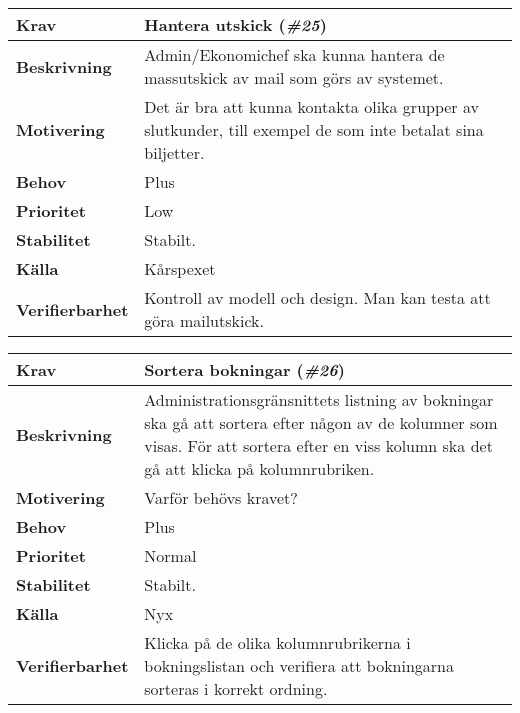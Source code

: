 \documentclass[a4paper, twoside, 11pt, titlepage]{article}
\begin{document}
	\begin{tabular} { p{2.6cm} p{12.5cm} }
		\hline
		\sffamily\textbf{Krav} & Hantera utskick (\emph{\#25})  \\
		\hline
		\sffamily\textbf{Beskrivning} & Admin/Ekonomichef ska kunna hantera de massutskick av mail som görs av systemet.  \\
		\hline
		\sffamily\textbf{Motivering} & Det är bra att kunna kontakta olika grupper av slutkunder, till exempel de som inte betalat sina biljetter.  \\
		\hline
		\sffamily\textbf{Behov} & Plus  \\
		\hline
		\sffamily\textbf{Prioritet} & Low  \\
		\hline
		\sffamily\textbf{Stabilitet} & Stabilt.  \\
		\hline
		\sffamily\textbf{Källa} & Kårspexet  \\
		\hline
		\sffamily\textbf{Verifierbarhet} & Kontroll av modell och design. Man kan testa att göra mailutskick.  \\
		\hline
	\end{tabular}
	\vspace{6mm}

	\begin{tabular} { p{2.6cm} p{12.5cm} }
		\hline
		\sffamily\textbf{Krav} & Sortera bokningar (\emph{\#26})  \\
		\hline
		\sffamily\textbf{Beskrivning} & Administrationsgränsnittets listning av bokningar ska gå att sortera efter någon av de kolumner som visas. För att sortera efter en viss kolumn ska det gå att klicka på kolumnrubriken.  \\
		\hline
		\sffamily\textbf{Motivering} & Varför behövs kravet?  \\
		\hline
		\sffamily\textbf{Behov} & Plus  \\
		\hline
		\sffamily\textbf{Prioritet} & Normal  \\
		\hline
		\sffamily\textbf{Stabilitet} & Stabilt.  \\
		\hline
		\sffamily\textbf{Källa} & Nyx  \\
		\hline
		\sffamily\textbf{Verifierbarhet} & Klicka på de olika kolumnrubrikerna i bokningslistan och verifiera att bokningarna sorteras i korrekt ordning.  \\
		\hline
	\end{tabular}
	\vspace{6mm}
\end{document}
